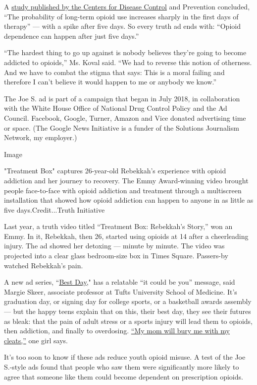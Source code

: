 A
\href{https://www.cdc.gov/mmwr/volumes/66/wr/mm6610a1.htm\#F1_down}{study
published by the Centers for Disease Control} and Prevention concluded,
``The probability of long-term opioid use increases sharply in the first
days of therapy'' --- with a spike after five days. So every truth ad
ends with: ``Opioid dependence can happen after just five days.''

``The hardest thing to go up against is nobody believes they're going to
become addicted to opioids,'' Ms. Koval said. ``We had to reverse this
notion of otherness. And we have to combat the stigma that says: This is
a moral failing and therefore I can't believe it would happen to me or
anybody we know.''

The Joe S. ad is part of a campaign that began in July 2018, in
collaboration with the White House Office of National Drug Control
Policy and the Ad Council. Facebook, Google, Turner, Amazon and Vice
donated advertising time or space. (The Google News Initiative is a
funder of the Solutions Journalism Network, my employer.)

Image

"Treatment Box" captures 26-year-old Rebekkah's experience with opioid
addiction and her journey to recovery. The Emmy Award-winning video
brought people face-to-face with opioid addiction and treatment through
a multiscreen installation that showed how opioid addiction can happen
to anyone in as little as five days.Credit...Truth Initiative

Last year, a truth video titled ``Treatment Box: Rebekkah's Story,'' won
an Emmy. In it, Rebekkah, then 26, started using opioids at 14 after a
cheerleading injury. The ad showed her detoxing --- minute by minute.
The video was projected into a clear glass bedroom-size box in Times
Square. Passers-by watched Rebekkah's pain.

A new ad series, ``\href{https://www.thetruth.com/o/opioids}{Best Day},"
has a relatable ``it could be you'' message, said Margie Skeer,
associate professor at Tufts University School of Medicine. It's
graduation day, or signing day for college sports, or a basketball
awards assembly --- but the happy teens explain that on this, their best
day, they see their futures as bleak: that the pain of adult stress or a
sports injury will lead them to opioids, then addiction, and finally to
overdosing.
\href{https://www.thetruth.com/o/articles/videos/signing-day}{``My mom
will bury me with my cleats,''} one girl says.

It's too soon to know if these ads reduce youth opioid misuse. A test of
the Joe S.-style ads found that people who saw them were significantly
more likely to agree that someone like them could become dependent on
prescription opioids.


